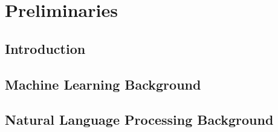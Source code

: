 \documentclass[
11pt, %
english, %
onehalfspacing, %
nolistspacing, %
headsepline, %
consistentlayout, %
]{MastersDoctoralThesis} %
\begin{document}

% 
% 
% 
% 




\mainmatter %

\pagestyle{thesis} %

\part{Preliminaries} 

\chapter{Introduction}\label{chapter:introduction}


\chapter{Machine Learning Background}\label{chapter:general_background}


\chapter{Natural Language Processing
Background}\label{chapter:domain_background}

\end{document}
